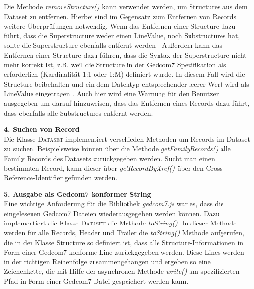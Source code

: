 Die Methode \textit{removeStructure()} kann verwendet werden, um Structures aus dem Dataset zu entfernen. Hierbei sind im Gegensatz zum Entfernen von Records weitere Überprüfungen notwendig. Wenn das Entfernen einer Structure dazu führt, dass die Superstructure weder einen LineValue, noch Substructures hat, sollte die Superstructure ebenfalls entfernt werden \cite{GEDCOM}. Außerdem kann das Entfernen einer Structure dazu führen, dass die Syntax der Superstructure nicht mehr korrekt ist, z.B. weil die Structure in der Gedcom7 Spezifikation als erforderlich (Kardinalität 1:1 oder 1:M) definiert wurde. In diesem Fall wird die Structure beibehalten und ein dem Datentyp entsprechender leerer Wert wird als LineValue eingetragen \cite{GEDCOM}. Auch hier wird eine Warnung für den Benutzer ausgegeben um darauf hinzuweisen, dass das Entfernen eines Records dazu führt, dass ebenfalls alle Substructures entfernt werden. 

\vspace{1em}
\textbf{4. Suchen von Record} \vspace{0.5em} \\
Die Klasse \textsc{Dataset} implementiert verschieden Methoden um Records im Dataset zu suchen. Beispielsweise können über die Methode \textit{getFamilyRecords()} alle Family Records des Datasets zurückgegeben werden. Sucht man einen bestimmten Record, kann dieser über \textit{getRecordByXref()} über den Cross-Reference-Identifier gefunden werden. 

\vspace{1em}
\textbf{5. Ausgabe als Gedcom7 konformer String} \vspace{0.5em} \\
Eine wichtige Anforderung für die Bibliothek \textit{gedcom7.js} war es, dass die eingelesenen Gedcom7 Dateien wiederausgegeben werden können. Dazu implementiert die Klasse \textsc{Dataset} die Methode \textit{toString()}. In dieser Methode werden für alle Records, Header und Trailer die \textit{toString()} Methode aufgerufen, die in der Klasse Structure so definiert ist, dass alle Structure-Informationen in Form einer Gedcom7-konforme Line zurückgegeben werden. Diese Lines werden in der richtigen Reihenfolge zusammengehangen und ergeben so eine Zeichenkette, die mit Hilfe der asynchronen Methode \textit{write()} am spezifizierten Pfad in Form einer Gedcom7 Datei gespeichert werden kann.

